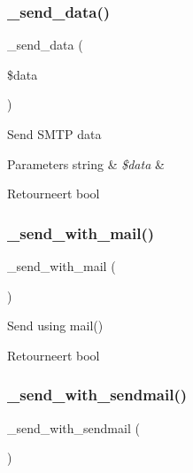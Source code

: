 \subsubsection{\texorpdfstring{\_send\_data()}{\_send\_data()}}
{\footnotesize\ttfamily \+\_\+send\+\_\+data (\begin{DoxyParamCaption}\item[{}]{\$data }\end{DoxyParamCaption})\hspace{0.3cm}{\ttfamily [protected]}}

Send S\+M\+TP data


\begin{DoxyParams}[1]{Parameters}
string & {\em \$data} & \\
\hline
\end{DoxyParams}
\begin{DoxyReturn}{Retourneert}
bool 
\end{DoxyReturn}
\mbox{\label{class_c_i___email_ae7e626556c4d619a7214bee6056badd4}} 
\subsubsection{\texorpdfstring{\_send\_with\_mail()}{\_send\_with\_mail()}}
{\footnotesize\ttfamily \+\_\+send\+\_\+with\+\_\+mail (\begin{DoxyParamCaption}{ }\end{DoxyParamCaption})\hspace{0.3cm}{\ttfamily [protected]}}

Send using mail()

\begin{DoxyReturn}{Retourneert}
bool 
\end{DoxyReturn}
\mbox{\label{class_c_i___email_a22ce9dc271da86e2a25041aa70e02502}} 
\subsubsection{\texorpdfstring{\_send\_with\_sendmail()}{\_send\_with\_sendmail()}}
{\footnotesize\ttfamily \+\_\+send\+\_\+with\+\_\+sendmail (\begin{DoxyParamCaption}{ }\end{DoxyParamCaption})\hspace{0.3cm}{\ttfamily [protected]}}

